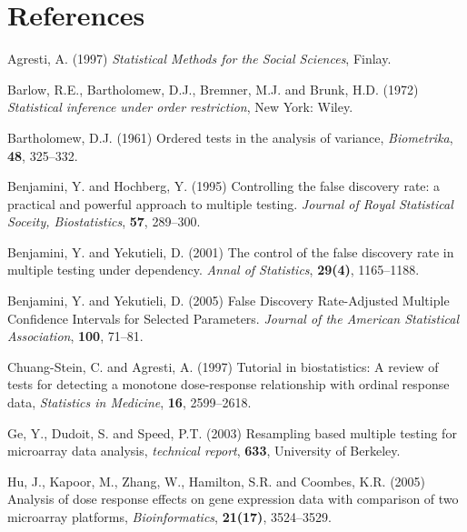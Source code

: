 \documentclass[10pt]{mybook4}
\begin{document}
\clearpage
\newpage


\section*{References}


\begin{list}{}{\setlength{\leftmargin}{.3in}\setlength{\itemindent}{-.2in}}

\item Agresti, A. (1997) \textit{Statistical Methods for the
Social Sciences}, Finlay.

\item Barlow, R.E., Bartholomew, D.J.,
Bremner, M.J. and Brunk, H.D. (1972) \textit{Statistical inference
under order restriction}, New York: Wiley.

\item Bartholomew, D.J. (1961) Ordered
tests in the analysis of variance, \textit{Biometrika}, \textbf{48},
325--332.%

\item Benjamini, Y. and Hochberg, Y.
(1995) Controlling the false discovery rate: a practical and
powerful approach to multiple testing. \textit{Journal of Royal
Statistical Soceity, Biostatistics}, \textbf{57}, 289--300.%


\item Benjamini, Y. and Yekutieli,
D. (2001) The control of the false discovery rate in multiple
testing under dependency. \textit{Annal of Statistics},
\textbf{29(4)}, 1165--1188.%


\item
Benjamini, Y. and Yekutieli, D. (2005) False Discovery
Rate-Adjusted Multiple Confidence Intervals for Selected Parameters.
{\em Journal of the American Statistical Association}, \textbf{100}, 71--81.%


\item Chuang-Stein, C. and Agresti, A. (1997) Tutorial in biostatistics:
A review of tests for detecting a monotone dose-response
relationship with ordinal response data, \textit{Statistics in
Medicine}, \textbf{16}, 2599--2618.%


\item Ge, Y., Dudoit, S. and Speed, P.T.
(2003) Resampling based multiple testing for microarray data
analysis,  \textit{technical report}, \textbf{633}, University of
Berkeley.%

\item Hu, J., Kapoor, M., Zhang, W.,
Hamilton, S.R. and Coombes, K.R. (2005) Analysis of dose response
effects on gene expression data with comparison of two microarray
platforms, \textit{Bioinformatics}, \textbf{21(17)}, 3524--3529.%


\end{list}
\end{document}
